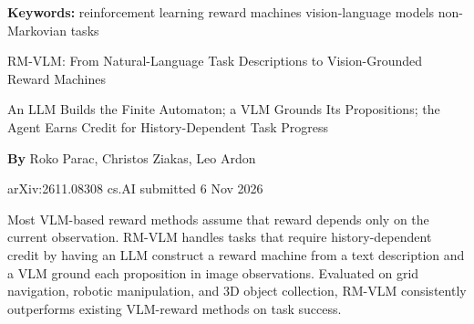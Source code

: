 \documentclass[10pt,twocolumn]{article}
\begin{document}
\setlength{\parindent}{0pt}
\setlength{\parskip}{4pt}

{\small\color{keywordgray}\textbf{Keywords:}
  reinforcement learning \textbullet{}
  reward machines \textbullet{}
  vision-language models \textbullet{}
  non-Markovian tasks}\par\vspace{4pt}

{\LARGE\bfseries\raggedright
  RM-VLM: From Natural-Language Task Descriptions to
  Vision-Grounded Reward Machines}\par\vspace{4pt}

{\large\itshape\raggedright
  An LLM Builds the Finite Automaton; a VLM Grounds Its Propositions;
  the Agent Earns Credit for History-Dependent Task Progress}\par\vspace{6pt}

{\small\textbf{By} Roko Parac, Christos Ziakas, Leo Ardon}\par\vspace{2pt}

{\small\color{keywordgray}arXiv:2611.08308 \textbullet{}
  cs.AI \textbullet{} submitted 6 Nov 2026}
\par\vspace{2pt}\noindent{\color{rulered}\rule{\columnwidth}{0.6pt}}\vspace{6pt}

Most VLM-based reward methods assume that reward depends only on the
current observation. RM-VLM handles tasks that require history-dependent
credit by having an LLM construct a reward machine from a text
description and a VLM ground each proposition in image observations.
Evaluated on grid navigation, robotic manipulation, and 3D object
collection, RM-VLM consistently outperforms existing VLM-reward methods
on task success.
\end{document}

